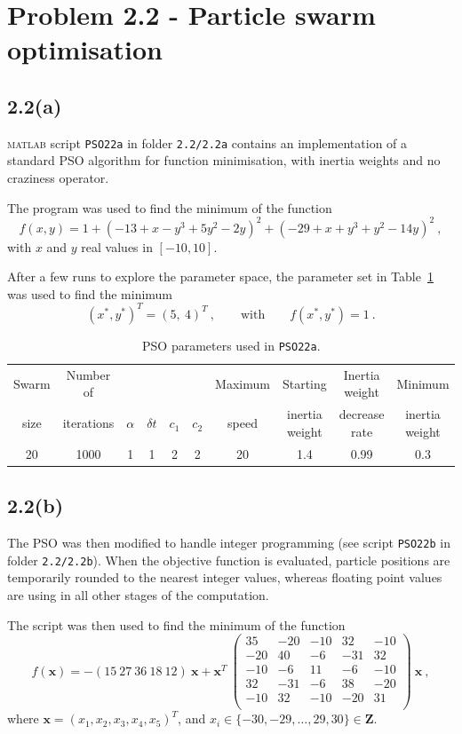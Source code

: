 \documentclass[12pt,titlepage]{article}
\begin{document}
\section*{Problem 2.2 - Particle swarm optimisation}

\subsection*{2.2(a)}
\textsc{matlab} script \texttt{PSO22a} in folder \texttt{2.2/2.2a} contains an implementation of a standard PSO algorithm for function minimisation, with inertia weights and no craziness operator.

The program was used to find the minimum of the function
\[
f(x, y) = 1 + (-13 + x - y^3 + 5y^2 - 2y)^2 + (-29 + x + y^3 	+ y^2 - 14y)^2 \ ,
\]
with $x$ and $y$ real values in $[-10, 10]$. 

After a few runs to explore the parameter space, the parameter set in Table~\ref{tab:2a} was used to find the minimum
\[
(x^*,y^*)^T = (5, \ 4)^T \ , \qquad \mbox{with} \qquad f(x^*,y^*) = 1 \ .
\]

\begin{table}[hbtp]
\centering
\begin{tabular}{cccccccccc}
\toprule
Swarm & Number of &  &  &  &  & Maximum & Starting & Inertia weight & Minimum \\
size & iterations & $ \alpha$ & $ \delta t$ & $ c_1$ & $ c_2$ & speed & inertia weight & decrease rate & inertia weight \\
\midrule
20 & 1000 & 1 & 1 & 2 & 2 & 20 & 1.4 & 0.99 & 0.3 \\
\bottomrule
\end{tabular}
\caption{\footnotesize PSO parameters used in \texttt{PSO22a}.}
\label{tab:2a}
\end{table}

\subsection*{2.2(b)}
The PSO was then modified to handle integer programming (see script \texttt{PSO22b} in folder \texttt{2.2/2.2b}). When the objective function is evaluated, particle positions are temporarily rounded to the nearest integer values, whereas floating point values are using in all other stages of the computation.

The script was then used to find the minimum of the function
\[
f(\bm{x}) = -(15 \ 27 \ 36 \ 18 \ 12) \ \bm{x} + \bm{x}^T \ \begin{pmatrix}
35 & -20 & -10 & 32 & -10 \\
-20 &  40 & -6 & -31 & 32 \\
-10 & -6 & 11 & -6 & -10 \\
32 & -31 & -6 & 38 & -20 \\
-10 & 32 & -10 & -20 & 31 \\
\end{pmatrix} \ \bm{x} \ ,
\]
where $ \bm{x} = (x_1 , x_2 , x_3 , x_4 , x_5 )^T$, and $x_i \in \lbrace -30, -29, \ldots , 29, 30 \rbrace \in \mathbf{Z}$.
\end{document}
